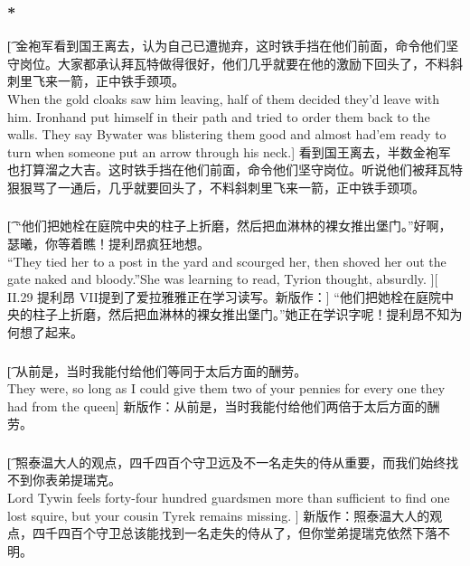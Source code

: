 \documentclass[12pt,a4paper]{article}
\begin{document}
\subsubsection{\color{red}*}\t[		
	金袍军看到国王离去，认为自己已遭抛弃，这时铁手挡在他们前面，命令他们坚守岗位。大家都承认拜瓦特做得很好，他们几乎就要在他的激励下回头了，不料斜刺里飞来一箭，正中铁手颈项。\\
	When the gold cloaks saw him leaving, half of them decided they'd leave with him. Ironhand put himself in their path and tried to order them back to the walls. They say Bywater was blistering them good and almost had'em ready to turn when someone put an arrow through his neck.]
	看到国王离去，半数金袍军也打算溜之大吉。这时铁手挡在他们前面，命令他们坚守岗位。听说他们被拜瓦特狠狠骂了一通后，几乎就要回头了，不料斜刺里飞来一箭，正中铁手颈项。


\subsubsection{}\t[
	 “他们把她栓在庭院中央的柱子上折磨，然后把血淋林的裸女推出堡门。”好啊，瑟曦，你等着瞧！提利昂疯狂地想。\\
	 “They tied her to a post in the yard and scourged her, then shoved her out the gate naked and bloody.”She was learning to read, Tyrion thought, absurdly. ][
	 II.29 提利昂 VII提到了爱拉雅雅正在学习读写。新版作：]
	 “他们把她栓在庭院中央的柱子上折磨，然后把血淋林的裸女推出堡门。”她正在学识字呢！提利昂不知为何想了起来。
	 
\subsubsection{}\t[
	从前是，当时我能付给他们等同于太后方面的酬劳。\\
	They were, so long as I could give them two of your pennies for every one they had from the queen]
	新版作：从前是，当时我能付给他们两倍于太后方面的酬劳。
	
\subsubsection{}\t[
	照泰温大人的观点，四千四百个守卫远及不一名走失的侍从重要，而我们始终找不到你表弟提瑞克。\\
	Lord Tywin feels forty-four hundred guardsmen more than sufficient to find one lost squire, but your cousin Tyrek remains missing. ]
	新版作：照泰温大人的观点，四千四百个守卫总该能找到一名走失的侍从了，但你堂弟提瑞克依然下落不明。
	
\end{document}
